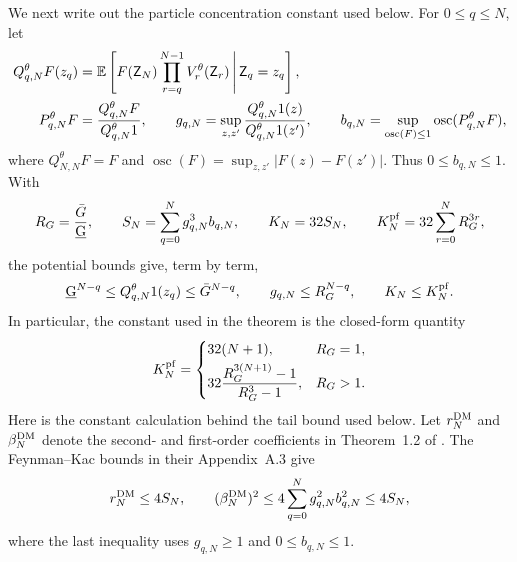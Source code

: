 \documentclass[11pt]{article}
\theoremstyle{thmstylethree}%
\begin{document}
We next write out the particle concentration constant used below.  For
$0\leq q\leq N$, let
\begin{align}
Q_{q,N}^\theta F(z_q)
 &=\mathbb{E}\left[
   F(\mathsf Z_N)\prod_{r=q}^{N-1}V_r^\theta(\mathsf Z_r)
   \,\middle|\,\mathsf Z_q=z_q
   \right],                                                     \label{eq:s2-q-semigroup}\\
P_{q,N}^\theta F
 &=\frac{Q_{q,N}^\theta F}{Q_{q,N}^\theta1},\qquad
g_{q,N}=\sup_{z,z'}
 \frac{Q_{q,N}^\theta1(z)}{Q_{q,N}^\theta1(z')},\qquad
b_{q,N}=\sup_{\operatorname{osc}(F)\leq1}
 \operatorname{osc}(P_{q,N}^\theta F),                         \label{eq:s2-semigroup-constants}
\end{align}
where $Q_{N,N}^\theta F=F$ and
$\operatorname{osc}(F)=\sup_{z,z'}|F(z)-F(z')|$.  Thus
$0\leq b_{q,N}\leq1$.  With
\begin{equation}
R_G=\frac{\bar G}{\underbar G},\qquad
S_N=\sum_{q=0}^Ng_{q,N}^3b_{q,N},\qquad K_N=32S_N,\qquad
K_N^{\rm pf}=32\sum_{r=0}^NR_G^{3r},                           \label{eq:s2-explicit-constant}
\end{equation}
the potential bounds give, term by term,
\begin{equation}
\underbar G^{N-q}\leq Q_{q,N}^\theta1(z_q)
 \leq\bar G^{N-q},\qquad
g_{q,N}\leq R_G^{N-q},\qquad K_N\leq K_N^{\rm pf}.             \label{eq:s2-explicit-constant-bound}
\end{equation}
In particular, the constant used in the theorem is the closed-form quantity
\begin{equation}
K_N^{\rm pf}=
\begin{cases}
32(N+1),&R_G=1,\\[1mm]
\displaystyle 32\frac{R_G^{3(N+1)}-1}{R_G^3-1},&R_G>1.
\end{cases}                                                     \label{eq:s2-explicit-constant-closed}
\end{equation}
Here is the constant calculation behind the tail bound used below.  Let
$r_N^{\rm DM}$ and $\beta_N^{\rm DM}$ denote the second- and first-order
coefficients in Theorem~1.2 of \citet{delMoral11}.  The Feynman--Kac bounds in
their Appendix~A.3 give
\begin{equation}
r_N^{\rm DM}\leq4S_N,
\qquad
(\beta_N^{\rm DM})^2
 \leq4\sum_{q=0}^Ng_{q,N}^2b_{q,N}^2
 \leq4S_N,                                                       \label{eq:s2-dm-coefficient-bounds}
\end{equation}
where the last inequality uses $g_{q,N}\geq1$ and $0\leq b_{q,N}\leq1$.
\end{document}
